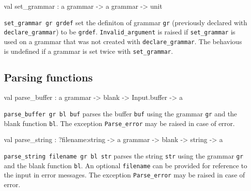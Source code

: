 \documentclass[11pt]{article}
\begin{document}
\label{val:Earley.set-underscoregrammar}\begin{ocamldoccode}
val set_grammar : {\textquotesingle}a grammar -> {\textquotesingle}a grammar -> unit
\end{ocamldoccode}
\begin{ocamldocdescription}
{\tt{set\_grammar gr grdef}} set the definiton of grammar {\tt{gr}} (previously
    declared with {\tt{declare\_grammar}}) to be  {\tt{grdef}}.  {\tt{Invalid\_argument}}
    is raised if {\tt{set\_grammar}} is used on a grammar that was not created
    with {\tt{declare\_grammar}}. The behavious is undefined if a  grammar  is
    set twice with {\tt{set\_grammar}}.


\end{ocamldocdescription}




\subsection{Parsing functions}




\label{val:Earley.parse-underscorebuffer}\begin{ocamldoccode}
val parse_buffer : {\textquotesingle}a grammar -> blank -> Input.buffer -> {\textquotesingle}a
\end{ocamldoccode}
\begin{ocamldocdescription}
{\tt{parse\_buffer gr bl buf}} parses the buffer {\tt{buf}} using  the  grammar
    {\tt{gr}} and the blank function {\tt{bl}}. The exception {\tt{Parse\_error}} may be
    raised in case of error.


\end{ocamldocdescription}




\label{val:Earley.parse-underscorestring}\begin{ocamldoccode}
val parse_string : ?filename:string -> {\textquotesingle}a grammar -> blank -> string -> {\textquotesingle}a
\end{ocamldoccode}
\begin{ocamldocdescription}
{\tt{parse\_string {}filename gr bl str}} parses the string {\tt{str}} using the
    grammar {\tt{gr}} and the blank function {\tt{bl}}. An optional {\tt{filename}} can
    be provided for reference  to  the  input  in  error  messages.  The
    exception {\tt{Parse\_error}} may be raised in case of error.


\end{ocamldocdescription}
\end{document}
